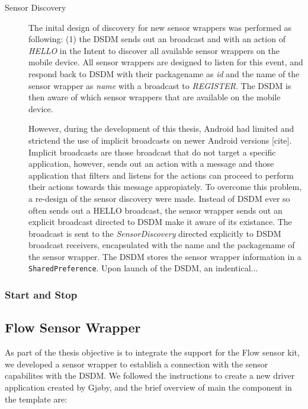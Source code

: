 \begin{description}
    \item[Sensor Discovery] The inital design of discovery for new sensor wrappers was performed as following: (1) the DSDM sends out an broadcast and with an action of \textit{HELLO} in the Intent to discover all available sensor wrappers on the mobile device. All sensor wrappers are designed to listen for this event, and respond back to DSDM with their packagename as \textit{id} and the name of the sensor wrapper as \textit{name} with a broadcast to \textit{REGISTER}. The DSDM is then aware of which sensor wrappers that are available on the mobile device. 
    
    However, during the development of this thesis, Android had limited and strictend the use of implicit broadcasts on newer Android versions [cite]. Implicit broadcasts are those broadcast that do not target a specific application, however, sends out an action with a message and those application that filters and listens for the actions can proceed to perform their actions towards this message appropiately. To overcome this problem, a re-design of the sensor discovery were made. Instead of DSDM ever so often sends out a HELLO broadcast, the sensor wrapper sends out an explicit broadcast directed to DSDM make it aware of its existance. The broadcast is sent to the \textit{SensorDiscovery} directed explicitly to DSDM broadcast receivers, encapsulated with the name and the packagename of the sensor wrapper. The DSDM stores the sensor wrapper information in a \verb|SharedPreference|. Upon launch of the DSDM, an indentical...

\end{description}

\subsubsection{Start and Stop}



\subsection{Flow Sensor Wrapper}
As part of the thesis objective is to integrate the support for the Flow sensor kit, we developed a sensor wrapper to establish a connection with the sensor capabilites with the DSDM. We followed the instructions to create a new driver application created by Gjøby, and the brief overview of main the component in the template are:

